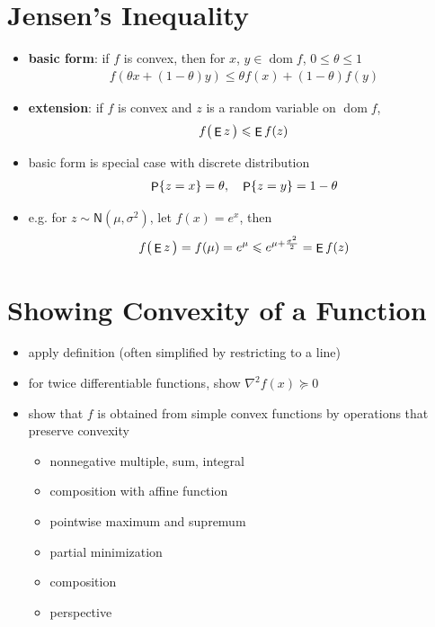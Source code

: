 \documentclass[11pt]{extarticle}
\newcommand{\ds}{\displaystyle}
\DeclareMathOperator*{\dom}{dom}
\DeclareMathOperator\prb{{\sf P}}
\DeclareMathOperator\expc{{\sf E}}
\theoremstyle{definition}
\begin{document}
\newpage

\section*{Jensen's Inequality}

\begin{itemize}
  \item {\bf basic form}: if $f$ is convex, then for $x$, $y\in\dom f$, $0\leqslant\theta\leqslant 1$
    \begin{align*}
      f(\theta x + (1 - \theta) y) \leqslant \theta f(x) + (1 - \theta) f(y)
    \end{align*}
  \item {\bf extension}: if $f$ is convex and $z$ is a random variable on $\dom f$,
    \begin{align*}
      f\big(\expc{z}\,\big) \leqslant \expc{f(z)}
    \end{align*}
  \item basic form is special case with discrete distribution
    \begin{align*}
      \prb\{z = x\} = \theta,\quad\prb\{z = y\} = 1 - \theta
    \end{align*}
  \item e.g. for $\ds z\sim\mathsf{N}(\mu,\sigma^2)$, let $\ds f(x) = e^x$, then
    \begin{align*}
      f\big(\expc{z}\,\big) = f(\mu) = e^{\mu}\leqslant e^{\mu + \frac{\sigma^2}{2}} = \expc{f(z)}
    \end{align*}
\end{itemize}

\newpage

\section*{Showing Convexity of a Function}

\begin{itemize}
  \item apply definition (often simplified by restricting to a line)
  \item for twice differentiable functions, show $\ds\nabla^2 f(x)\succcurlyeq 0$
  \item show that $f$ is obtained from simple convex functions by operations that preserve convexity
    \begin{itemize}
      \item nonnegative multiple, sum, integral
      \item composition with affine function
      \item pointwise maximum and supremum
      \item partial minimization
      \item composition
      \item perspective
    \end{itemize}
\end{itemize}
\end{document}

